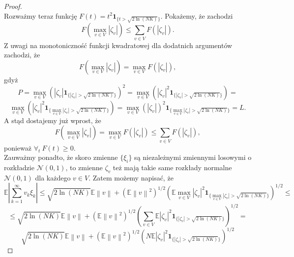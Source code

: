 \documentclass{article}
\newcommand{\norm}[1]{\left\lVert#1\right\rVert}
\begin{document}
\begin{proof}
\begin{displaymath}
\end{displaymath}
Rozważmy teraz funkcję $F(t)=t^2\pmb{1}_{\{t> \sqrt{2\ln (NK)}\}}$. Pokażemy, że zachodzi
\begin{displaymath}
F(\max_{v\in V}|\zeta_v|)\leq \sum_{v\in V}F(|\zeta_v|).
\end{displaymath}
Z uwagi na monotoniczność funkcji kwadratowej dla dodatnich argumentów zachodzi, że
\begin{displaymath}
F(\max_{v\in V}|\zeta_v|)= \max_{v\in V}F(|\zeta_v|),
\end{displaymath}
gdyż 
\begin{displaymath}
P=\max_{v\in V}\left(|\zeta_v|\pmb{1}_{\{|\zeta_v|> \sqrt{2\ln (NK)}\}}\right)^2=\max_{v\in V}\left(|\zeta_v|^2\pmb{1}_{\{|\zeta_v|> \sqrt{2\ln (NK)}\}}\right)=
\end{displaymath}
\begin{displaymath}
\max_{v\in V}\left(|\zeta_v|^2\pmb{1}_{\{\max_{v\in V}|\zeta_v|> \sqrt{2\ln (NK)}\}}\right)=\max_{v\in V}\left(|\zeta_v|\right)^2\pmb{1}_{\{\max_{v\in V}|\zeta_v|> \sqrt{2\ln (NK)}\}}=L.
\end{displaymath}
A stąd dostajemy już wprost, że 
\begin{displaymath}
F(\max_{v\in V}|\zeta_v|)= \max_{v\in V}F(|\zeta_v|)\leq \sum_{v\in V}F(|\zeta_v|),
\end{displaymath}
ponieważ $\forall_t\ F(t)\geq 0$.\\
Zauważmy ponadto, że skoro zmienne $\{\xi_i\}$ są niezależnymi zmiennymi losowymi o rozkładzie $\mathcal{N}(0,1)$, to zmienne $\zeta_v$ też mają takie same rozkłady normalne $\mathcal{N}(0,1)$ dla każdego $v\in V$. Zatem możemy napisać, że
\begin{displaymath}
\mathbb{E}\left|\sum_{k=1}^{\infty}v_k\xi_k\right|\leq \sqrt{2\ln (NK)}\mathbb{E}\norm{v}+\left(\mathbb{E}\norm{v}^2\right)^{1/2}\left(\mathbb{E}\max_{v\in V}|\zeta_v|^2\pmb{1}_{\{\max_{v\in V}|\zeta_v|> \sqrt{2\ln (NK)}\}}\right)^{1/2}\leq
\end{displaymath}
\begin{displaymath}
\leq \sqrt{2\ln (NK)}\mathbb{E}\norm{v}+\left(\mathbb{E}\norm{v}^2\right)^{1/2}\left(\sum_{v\in V}\mathbb{E}|\zeta_v|^2\pmb{1}_{\{|\zeta_v|> \sqrt{2\ln (NK)}\}}\right)^{1/2}=
\end{displaymath}
\begin{displaymath}
\sqrt{2\ln (NK)}\mathbb{E}\norm{v}+\left(\mathbb{E}\norm{v}^2\right)^{1/2}\left(N\mathbb{E}|\zeta_v|^2\pmb{1}_{\{|\zeta_v|> \sqrt{2\ln (NK)}\}}\right)^{1/2}
\end{displaymath}

\end{proof}
\end{document}
